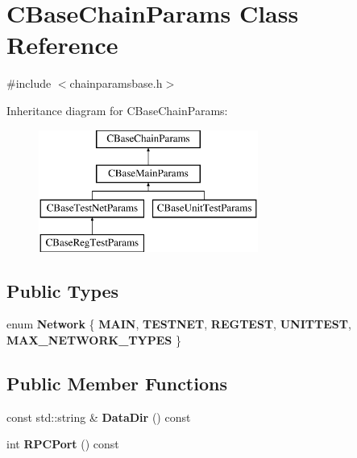 \hypertarget{class_c_base_chain_params}{}\section{C\+Base\+Chain\+Params Class Reference}
\label{class_c_base_chain_params}


{\ttfamily \#include $<$chainparamsbase.\+h$>$}

Inheritance diagram for C\+Base\+Chain\+Params\+:\begin{figure}[H]
\begin{center}
\leavevmode
\includegraphics[height=4.000000cm]{class_c_base_chain_params}
\end{center}
\end{figure}
\subsection*{Public Types}
\begin{DoxyCompactItemize}
\item 
\mbox{\label{class_c_base_chain_params_a19fb46b499c21801c0ff3c8607a0994e}} 
enum {\bfseries Network} \{ \newline
{\bfseries M\+A\+IN}, 
{\bfseries T\+E\+S\+T\+N\+ET}, 
{\bfseries R\+E\+G\+T\+E\+ST}, 
{\bfseries U\+N\+I\+T\+T\+E\+ST}, 
\newline
{\bfseries M\+A\+X\+\_\+\+N\+E\+T\+W\+O\+R\+K\+\_\+\+T\+Y\+P\+ES}
 \}
\end{DoxyCompactItemize}
\subsection*{Public Member Functions}
\begin{DoxyCompactItemize}
\item 
\mbox{\label{class_c_base_chain_params_a4b142e94ae27f860522dd5efef41fb67}} 
const std\+::string \& {\bfseries Data\+Dir} () const
\item 
\mbox{\label{class_c_base_chain_params_a790801bda78d70db56da89ca43934a63}} 
int {\bfseries R\+P\+C\+Port} () const
\end{DoxyCompactItemize}
